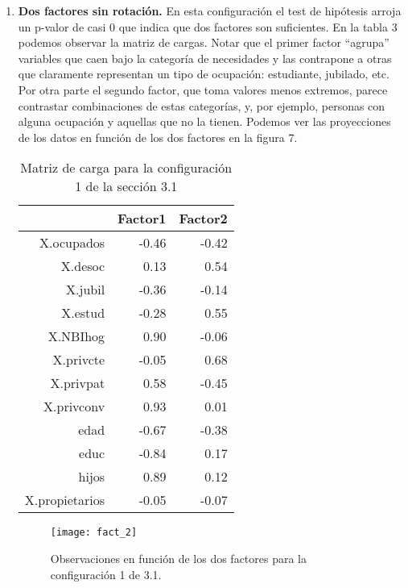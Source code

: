 \documentclass[a4paper,10pt]{article}
\begin{document}
\begin{enumerate}
 \item \textbf{Dos factores sin rotación.} En esta configuración el test de hipótesis arroja un p-valor de casi 0 que indica que dos factores
 son suficientes. En la tabla 3 podemos observar la matriz de cargas. Notar que el primer factor ``agrupa'' variables que caen bajo la categoría de 
 necesidades y las contrapone a otras que claramente representan un tipo de ocupación: estudiante, jubilado, etc. Por otra parte el segundo factor, que toma
 valores menos extremos, parece contrastar combinaciones de estas categorías, y, por ejemplo, personas con alguna ocupación y aquellas que no la tienen.
 Podemos ver las proyecciones de los datos en función de los dos factores en la figura 7.
 
  \begin{table}[ht]
    \centering
    \begin{tabular}{rrr}
      \hline
    & Factor1 & Factor2 \\ 
      \hline
      X.ocupados & -0.46 & -0.42 \\ 
      X.desoc & 0.13 & 0.54 \\ 
      X.jubil & -0.36 & -0.14 \\ 
      X.estud & -0.28 & 0.55 \\ 
      X.NBIhog & 0.90 & -0.06 \\ 
      X.privcte & -0.05 & 0.68 \\ 
      X.privpat & 0.58 & -0.45 \\ 
      X.privconv & 0.93 & 0.01 \\ 
      edad & -0.67 & -0.38 \\ 
      educ & -0.84 & 0.17 \\ 
      hijos & 0.89 & 0.12 \\ 
      X.propietarios & -0.05 & -0.07 \\ 
      \hline
    \end{tabular}
    \caption{Matriz de carga para la configuración 1 de la sección 3.1}
  \end{table}
  
  \begin{figure}[h]
  \centering
  \texttt{[image: fact\_2]}
  \caption{Observaciones en función de los dos factores para la configuración 1 de 3.1.}
  \end{figure}
 

\end{enumerate}
\end{document}
